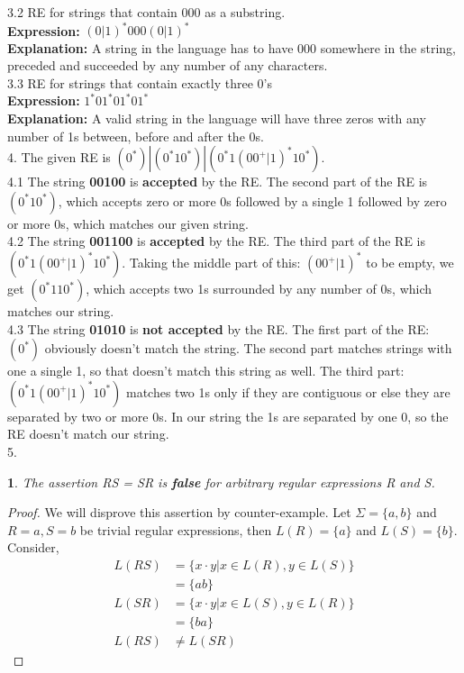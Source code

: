\documentclass[11pt]{article}
\newtheorem{theorem}{}
\begin{document}
3.2 RE for strings that contain 000 as a substring. \\ 
\textbf{Expression:} $(0 | 1)^*000(0 | 1)^*$ \\
\textbf{Explanation:} A string in the language has to have 000 somewhere in the string, preceded and succeeded by
any number of any characters.\\

3.3 RE for strings that contain exactly three 0's \\ 
\textbf{Expression:} $1^*01^*01^*01^*$ \\
\textbf{Explanation:} A valid string in the language will have three zeros with any number of 1s between, before and
after the 0s.\\

4. The given RE is $(0^*) | (0^*10^*) | (0^*1(00^+|1)^*10^*)$. \\

4.1 The string \textbf{00100} is \textbf{accepted} by the RE. The second part of the RE
is $(0^*10^*)$, which accepts zero or more 0s followed by a single 1 followed
by zero or more 0s, which matches our given string. \\

4.2 The string \textbf{001100} is \textbf{accepted} by the RE. The third part of the RE
is $(0^*1(00^+|1)^*10^*)$. Taking the middle part of this: $(00^+|1)^*$ to be empty, we get
$(0^*110^*)$, which accepts two 1s surrounded by any number of 0s, which matches our string. \\

4.3 The string \textbf{01010} is \textbf{not accepted} by the RE. The first part of the RE:
$(0^*)$ obviously doesn't match the string. The second part matches strings with one a single
1, so that doesn't match this string as well. The third part: $(0^*1(00^+|1)^*10^*)$ matches
two 1s only if they are contiguous or else they are separated by two or more 0s. In our string
the 1s are separated by one 0, so the RE doesn't match our string. \\

5.
\begin{theorem}
	The assertion RS = SR is \textbf{false} for arbitrary regular expressions R and S.
\end{theorem}
\begin{proof}
	We will disprove this assertion by counter-example. Let $\Sigma = \{a,b\}$ and $R = a, S = b$
	be trivial regular expressions, then $L(R) = \{a\}$ and $L(S) = \{b\}$. Consider,
	\begin{align*}
		L(RS)&= \{ x \cdot y | x \in L(R), y \in L(S) \} \\
				 &= \{ ab \} \\
		L(SR)&= \{ x \cdot y | x \in L(S), y \in L(R) \} \\
				 &= \{ ba \} \\
		L(RS)&\neq L(SR)
	\end{align*}
\end{proof}
\end{document}
